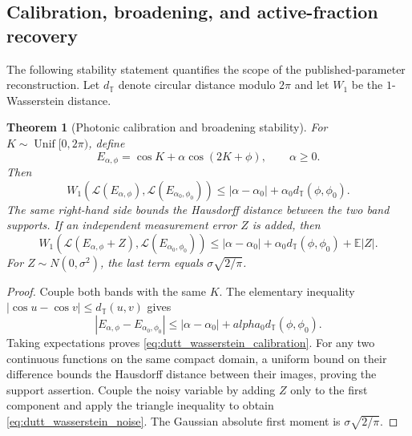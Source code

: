 \documentclass[11pt]{amsart}
\numberwithin{equation}{section}\setcounter{tocdepth}{3}\setcounter{secnumdepth}{3}
\newtheorem{theorem}{Theorem}[section]\newtheorem{proposition}[theorem]{Proposition}
\begin{document}
\subsection{Calibration, broadening, and active-fraction recovery}
\label{subsec:dutt_sensitivity}
The following stability statement quantifies the scope of the published-parameter
reconstruction.  Let $d_{\mathbb T}$ denote circular distance modulo $2\pi$ and let
$W_1$ be the $1$-Wasserstein distance.
\begin{theorem}[Photonic calibration and broadening stability]
\label{thm:dutt_stability}
For $K\sim\operatorname{Unif}[0,2\pi)$, define
\begin{equation}
 E_{\alpha,\phi}=\cos K+\alpha\cos(2K+\phi),\qquad \alpha\ge0.
 \label{eq:dutt_stability_band}
\end{equation}
Then
\begin{equation}
 W_1\!\left(\mathcal L(E_{\alpha,\phi}),
             \mathcal L(E_{\alpha_0,\phi_0})\right)
 \le |\alpha-\alpha_0|+\alpha_0d_{\mathbb T}(\phi,\phi_0).
 \label{eq:dutt_wasserstein_calibration}
\end{equation}
The same right-hand side bounds the Hausdorff distance between the two band supports.
If an independent measurement error $Z$ is added, then
\begin{equation}
 W_1\!\left(\mathcal L(E_{\alpha,\phi}+Z),
             \mathcal L(E_{\alpha_0,\phi_0})\right)
 \le |\alpha-\alpha_0|+\alpha_0d_{\mathbb T}(\phi,\phi_0)
      +\mathbb E|Z|.
 \label{eq:dutt_wasserstein_noise}
\end{equation}
For $Z\sim N(0,\sigma^2)$, the last term equals
$\sigma\sqrt{2/\pi}$.
\end{theorem}
\begin{proof}
Couple both bands with the same $K$.  The elementary inequality
$|\cos u-\cos v|\le d_{\mathbb T}(u,v)$ gives
\begin{equation}
 |E_{\alpha,\phi}-E_{\alpha_0,\phi_0}|
 \le |\alpha-\alpha_0|+alpha_0d_{\mathbb T}(\phi,\phi_0).
 \label{eq:dutt_pointwise_calibration_bound}
\end{equation}
Taking expectations proves \eqref{eq:dutt_wasserstein_calibration}.  For any two
continuous functions on the same compact domain, a uniform bound on their difference
bounds the Hausdorff distance between their images, proving the support assertion.
Couple the noisy variable by adding $Z$ only to the first component and apply the
triangle inequality to obtain \eqref{eq:dutt_wasserstein_noise}.  The Gaussian absolute
first moment is $\sigma\sqrt{2/\pi}$.
\end{proof}
\end{document}
